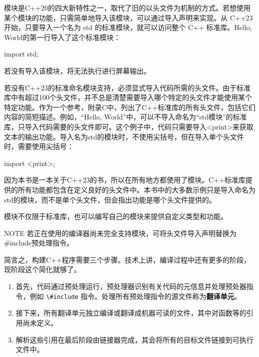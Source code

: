 
模块是C++20的四大新特性之一，取代了旧的以头文件为机制的方式。若想使用某个模块的功能，只需简单地导入该模块，可以通过导入声明来实现。从 C++23 开始，只要导入一个名为 std 的标准模块，就可以访问整个 C++ 标准库。Hello, World的第一行导入了这个标准模块：

\begin{cpp}
import std;
\end{cpp}

若没有导入该模块，将无法执行进行屏幕输出。

若没有C++23的标准命名模块支持，必须显式导入代码所需的头文件。由于标准库中有超过100个头文件，并不总是清楚需要导入哪个特定的头文件才能使用某个特定功能。作为一个参考，附录C中，列出了C++标准库的所有头文件，包括它们内容的简短描述。例如，“Hello, World”中，可以不导入命名为“std模块”的标准库，只导入代码需要的头文件即可。这个例子中，代码只需要导入<print>来获取文本的输出功能。导入名为std的模块时，不使用尖括号，但在导入单个头文件时，需要使用尖括号：

\begin{cpp}
import <print>;
\end{cpp}

因为本书是一本关于C++23的书，所以在所有地方都使用了模块。C++标准库提供的所有功能都包含在定义良好的头文件中。本书中的大多数示例只是导入命名为std的模块，而不是单个头文件，但会指出功能是哪个头文件提供的。

模块不仅限于标准库，也可以编写自己的模块来提供自定义类型和功能。

\begin{myNotic}{NOTE}
若正在使用的编译器尚未完全支持模块，可将头文件导入声明替换为\#include预处理指令。
\end{myNotic}


简言之，构建C++程序需要三个步骤。技术上讲，编译过程中还有更多的阶段，现阶段这个简化就够了。

\begin{enumerate}
\item
首先，代码通过预处理运行，预处理器识别有关代码的元信息并处理预处器指令，例如 \verb|\#include| 指令。处理所有预处理指令的源文件称为\textbf{翻译单元}。

\item
接下来，所有翻译单元独立编译或翻译成机器可读的文件，其中对函数等的引用尚未定义。

\item
解析这些引用在最后阶段由链接器完成，其会将所有的目标文件链接到可执行文件中。
\end{enumerate}

